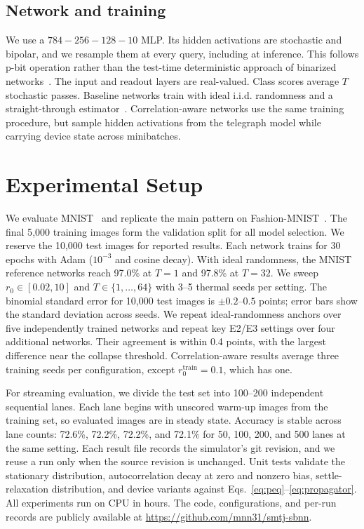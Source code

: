 \documentclass[journal]{IEEEtran}
\newcommand{\rzero}{r_0}
\begin{document}
\subsection{Network and training}
We use a $784{-}256{-}128{-}10$ MLP. Its hidden activations are stochastic
and bipolar, and we resample them at every query, including at inference.
This follows p-bit operation rather than the test-time deterministic approach
of binarized networks~\cite{courbariaux2015binaryconnect,hubara2016binarized}.
The input and readout layers are real-valued. Class scores average $T$
stochastic passes. Baseline networks train with ideal i.i.d. randomness and
a straight-through estimator~\cite{bengio2013estimating}. Correlation-aware
networks use the same training procedure, but sample hidden activations from
the telegraph model while carrying device state across minibatches.

\section{Experimental Setup}
\label{sec:setup}
We evaluate MNIST~\cite{lecun1998gradient} and replicate the main pattern
on Fashion-MNIST~\cite{xiao2017fashion}. The final 5{,}000 training images
form the validation split for all model selection. We reserve the 10{,}000
test images for reported results. Each network trains for 30 epochs with Adam
($10^{-3}$ and cosine decay). With ideal randomness, the MNIST reference
networks reach 97.0\% at $T{=}1$ and 97.8\% at $T{=}32$. We sweep
$\rzero\in[0.02,10]$ and $T\in\{1,\dots,64\}$ with 3--5 thermal seeds per
setting. The binomial standard error for 10{,}000 test images is
$\pm0.2$--$0.5$ points; error bars show the standard deviation across seeds.
We repeat ideal-randomness anchors over five independently trained networks
and repeat key E2/E3 settings over four additional networks. Their agreement
is within 0.4 points, with the largest difference near the collapse
threshold. Correlation-aware results average three training seeds per
configuration, except $\rzero^{\mathrm{train}}{=}0.1$, which has one.

For streaming evaluation, we divide the test set into 100--200 independent
sequential lanes. Each lane begins with unscored warm-up images from the
training set, so evaluated images are in steady state. Accuracy is stable
across lane counts: 72.6\%, 72.2\%, 72.2\%, and 72.1\% for 50, 100, 200,
and 500 lanes at the same setting. Each result file records the simulator's
git revision, and we reuse a run only when the source revision is unchanged.
Unit tests validate the stationary distribution, autocorrelation decay at
zero and nonzero bias, settle-relaxation distribution, and device variants
against Eqs.~\eqref{eq:peq}--\eqref{eq:propagator}. All experiments run on
CPU in hours. The code, configurations, and per-run records are publicly available at \url{https://github.com/mnn31/smtj-sbnn}.
\end{document}
